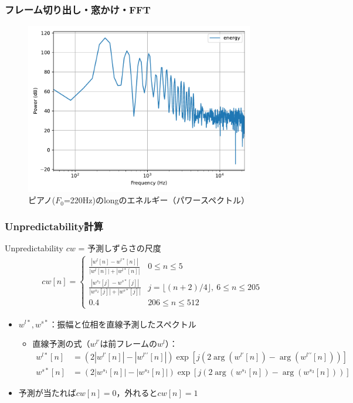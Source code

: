\documentclass[14pt,xcolor=dvipsnames,table,dvipdfmx]{beamer}
\begin{document}
\begin{frame}[c]
    \frametitle{フレーム切り出し・窓かけ・FFT}
    \begin{figure}
        \includegraphics[width=100mm]{./figs/psyco_analyze_energy.pdf}
        \caption*{ピアノ($F_{0}$=220Hz)のlongのエネルギー（パワースペクトル）}
    \end{figure}
\end{frame}

\begin{frame}[c]
    \frametitle{Unpredictability計算}
    Unpredictability $cw$ = 予測しずらさの尺度
    \small
    \begin{align}
        cw[n] = \left\{ \begin{array}{cl}
            \frac{|w^{l}[n] - w^{l\ast}[n]|}{|w^{l}[n]| + |w^{l\ast}[n]|} & 0 \leq n \leq 5 \\
            \frac{|w^{s_{2}}[j] - w^{s\ast}[j]|}{|w^{s_{2}}[j]| + |w^{s\ast}[j]|} & j = \lfloor (n + 2)/4 \rfloor,\ 6 \leq n \leq 205 \\
            0.4 & 206 \leq n \leq 512
        \end{array} \right.
    \end{align}
    \normalsize
    \begin{itemize}
        \item $w^{l\ast}, w^{s\ast}$：振幅と位相を直線予測したスペクトル
            \begin{itemize}
                \item 直線予測の式（$w^{l\prime}$は前フレームの$w^{l}$）：
                    \footnotesize
                    \begin{align}
                        w^{l\ast}[n] &= (2|w^{l\prime}[n]| - |w^{l\prime\prime}[n]|) \exp[j (2\arg(w^{l\prime}[n]) - \arg(w^{l\prime\prime}[n]))] \\
                        w^{s\ast}[n] &= (2|w^{s_{1}}[n]| - |w^{s_{3}}[n]|) \exp[j (2\arg(w^{s_{1}}[n]) - \arg(w^{s_{3}}[n]))]
                    \end{align}
            \end{itemize}
        \item 予測が当たれば$cw[n] = 0$，外れると$cw[n] = 1$
    \end{itemize}
\end{frame}
\end{document}
